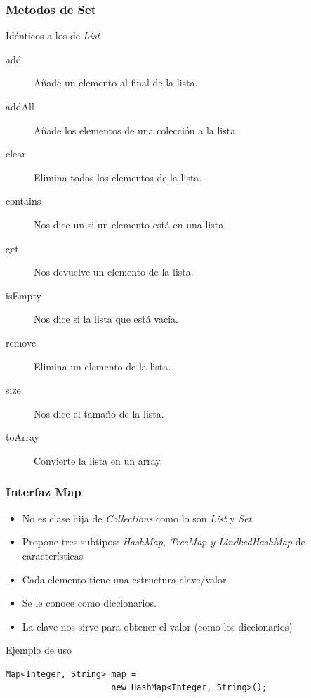\documentclass{beamer}
\begin{document}
\begin{frame}
\frametitle{Metodos de Set}
Idénticos a los de \emph{List}
\begin{description}
\item[add] Añade un elemento al final de la lista.
\item[addAll] Añade los elementos de una colección a la lista.
\item[clear] Elimina todos los elementos de la lista.
\item[contains] Nos dice un si un elemento está en una lista.
\item[get] Nos devuelve un elemento de la lista.
\item[isEmpty] Nos dice si la lista que está vacía.
\item[remove] Elimina un elemento de la lista.
\item[size] Nos dice el tamaño de la lista.
\item[toArray] Convierte la lista en un array.
\end{description}
\end{frame}


\begin{frame}[fragile]
\frametitle{Interfaz Map}
\begin{itemize}[<+->]
\item No es clase hija de \emph{Collections} como lo son \emph{List} y \emph{Set}
\item Propone tres subtipos: \emph{HashMap, TreeMap y LindkedHashMap} de características
\item Cada elemento tiene una estructura clave/valor
\item Se le conoce como diccionarios.
\item La clave nos sirve para obtener el valor (como los diccionarios) 
\end{itemize}
\pause
\begin{block}{Ejemplo de uso}
\begin{verbatim}
Map<Integer, String> map = 
                     new HashMap<Integer, String>();
\end{verbatim}
\end{block}
\end{frame}
\end{document}
